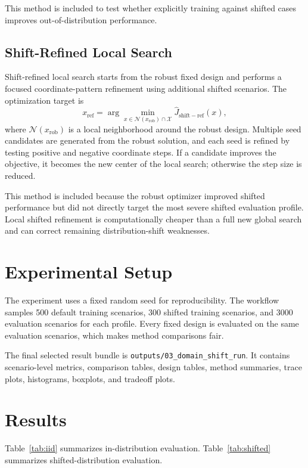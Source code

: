 \documentclass[conference]{IEEEtran}
\begin{document}
This method is included to test whether explicitly training against shifted cases improves out-of-distribution performance.

\subsection{Shift-Refined Local Search}
Shift-refined local search starts from the robust fixed design and performs a focused coordinate-pattern refinement using additional shifted scenarios. The optimization target is
\begin{equation}
x_{\mathrm{ref}}=\arg\min_{x\in\mathcal{N}(x_{\mathrm{rob}})\cap\mathcal{X}}
\hat{J}_{\mathrm{shift-ref}}(x),
\end{equation}
where $\mathcal{N}(x_{\mathrm{rob}})$ is a local neighborhood around the robust design. Multiple seed candidates are generated from the robust solution, and each seed is refined by testing positive and negative coordinate steps. If a candidate improves the objective, it becomes the new center of the local search; otherwise the step size is reduced.

This method is included because the robust optimizer improved shifted performance but did not directly target the most severe shifted evaluation profile. Local shifted refinement is computationally cheaper than a full new global search and can correct remaining distribution-shift weaknesses.

\section{Experimental Setup}
The experiment uses a fixed random seed for reproducibility. The workflow samples 500 default training scenarios, 300 shifted training scenarios, and 3000 evaluation scenarios for each profile. Every fixed design is evaluated on the same evaluation scenarios, which makes method comparisons fair.

The final selected result bundle is \texttt{outputs/03\_domain\_shift\_run}. It contains scenario-level metrics, comparison tables, design tables, method summaries, trace plots, histograms, boxplots, and tradeoff plots.

\section{Results}
Table~\ref{tab:iid} summarizes in-distribution evaluation. Table~\ref{tab:shifted} summarizes shifted-distribution evaluation.
\end{document}
